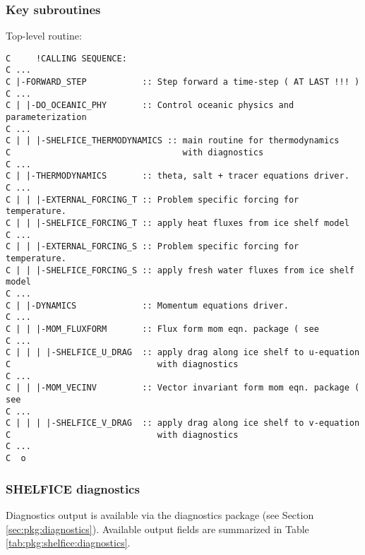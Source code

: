 
\subsubsection{Key subroutines
\label{sec:pkg:shelfice:subroutines}}

Top-level routine: 

{\footnotesize
\begin{verbatim}
C     !CALLING SEQUENCE:
C ...
C |-FORWARD_STEP           :: Step forward a time-step ( AT LAST !!! )
C ...
C | |-DO_OCEANIC_PHY       :: Control oceanic physics and parameterization
C ...
C | | |-SHELFICE_THERMODYNAMICS :: main routine for thermodynamics
C                                  with diagnostics
C ...
C | |-THERMODYNAMICS       :: theta, salt + tracer equations driver.
C ...
C | | |-EXTERNAL_FORCING_T :: Problem specific forcing for temperature.
C | | |-SHELFICE_FORCING_T :: apply heat fluxes from ice shelf model
C ...
C | | |-EXTERNAL_FORCING_S :: Problem specific forcing for temperature.
C | | |-SHELFICE_FORCING_S :: apply fresh water fluxes from ice shelf model
C ...
C | |-DYNAMICS             :: Momentum equations driver.
C ...
C | | |-MOM_FLUXFORM       :: Flux form mom eqn. package ( see
C ...
C | | | |-SHELFICE_U_DRAG  :: apply drag along ice shelf to u-equation
C                             with diagnostics
C ...
C | | |-MOM_VECINV         :: Vector invariant form mom eqn. package ( see
C ...
C | | | |-SHELFICE_V_DRAG  :: apply drag along ice shelf to v-equation
C                             with diagnostics
C ...
C  o
\end{verbatim}
}



\subsubsection{SHELFICE diagnostics
\label{sec:pkg:shelfice:diagnostics}}

Diagnostics output is available via the diagnostics package
(see Section \ref{sec:pkg:diagnostics}).
Available output fields are summarized in 
Table \ref{tab:pkg:shelfice:diagnostics}.

